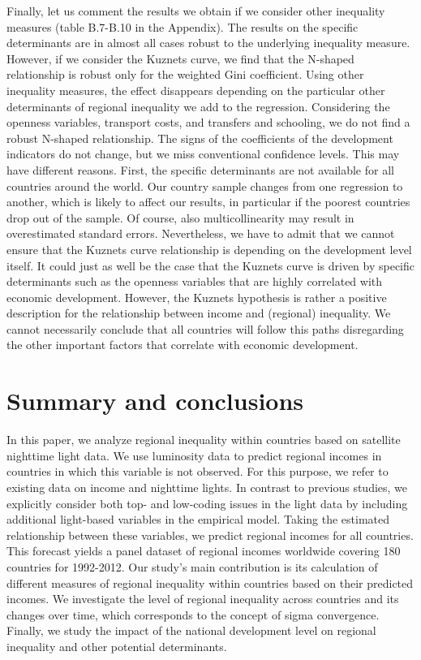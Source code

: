 \documentclass[10pt]{article}
\begin{document}
Finally, let us comment the results we obtain if we consider other inequality measures (table B.7-B.10 in the Appendix). The results on the specific determinants are in almost all cases robust to the underlying inequality measure. However, if we consider the Kuznets curve, we find that the N-shaped relationship is robust only for the weighted Gini coefficient. Using other inequality measures, the effect disappears depending on the particular other determinants of regional inequality we add to the regression. Considering the openness variables, transport costs, and transfers and schooling, we do not find a robust N-shaped relationship. The signs of the coefficients of the development indicators do not change, but we miss conventional confidence levels. This may have different reasons. First, the specific determinants are not available for all countries around the world. Our country sample changes from one regression to another, which is likely to affect our results, in particular if the poorest countries drop out of the sample. Of course, also multicollinearity may result in overestimated standard errors. Nevertheless, we have to admit that we cannot ensure that the Kuznets curve relationship is depending on the development level itself. It could just as well be the case that the Kuznets curve is driven by specific determinants such as the openness variables that are highly correlated with economic development. However, the Kuznets hypothesis is rather a positive description for the relationship between income and (regional) inequality. We cannot necessarily conclude that all countries will follow this paths disregarding the other important factors that correlate with economic development.




\section{Summary and conclusions}

In this paper, we analyze regional inequality within countries based on satellite nighttime light data. 
We use luminosity data to predict regional incomes in countries in which this variable is not observed. 
For this purpose, we refer to existing data on income and nighttime lights. 
In contrast to previous studies, we explicitly consider both top- and low-coding issues in the light data by including additional light-based variables in the empirical model. 
Taking the estimated relationship between these variables, we predict regional incomes for all countries. 
This forecast yields a panel dataset of regional incomes worldwide covering 180 countries for 1992-2012. 
Our study's main contribution is its calculation of different measures of regional inequality within countries based on their predicted incomes. 
We investigate the level of regional inequality across countries and its changes over time, which corresponds to the concept of sigma convergence.
Finally, we study the impact of the national development level on regional inequality and other potential determinants.
\end{document}
